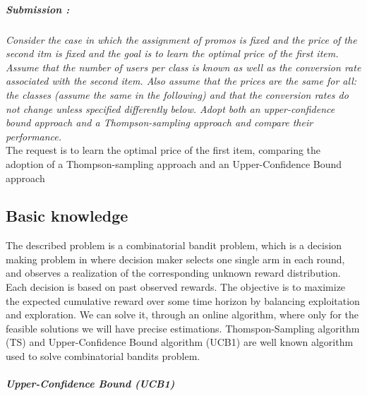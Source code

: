 \subparagraph*{Submission : }
\textit{Consider the case in which the assignment of promos is fixed and the price of the second itm is fixed and the goal is to learn the optimal price of the first item. Assume that the number of users per class is known as well as the conversion rate associated with the second item. Also assume that the prices are the same for all: the classes (assume the same in the following) and that the conversion rates do not change unless specified differently below. Adopt both an upper-confidence bound approach and a Thompson-sampling approach and compare their performance.}\\

The request is to learn the optimal price of the first item, comparing the adoption of a Thompson-sampling approach and an Upper-Confidence Bound approach

\subsection*{Basic knowledge}
The described problem is a combinatorial bandit problem, which is a decision making problem in where decision maker selects one single arm in each round, and observes a realization of the corresponding unknown reward distribution. Each decision is based on past observed rewards. The objective is to maximize the expected cumulative reward over some time horizon by balancing exploitation and exploration. We can solve it, through an online algorithm, where only for the feasible solutions we will have precise estimations. Thomspon-Sampling algorithm (TS) and Upper-Confidence Bound algorithm (UCB1) are well known algorithm used to solve combinatorial bandits problem.

\subparagraph*{Upper-Confidence Bound (UCB1)}

